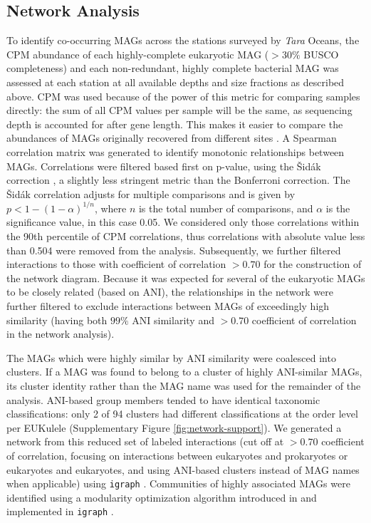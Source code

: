 \documentclass[12pt]{article}
\numberwithin{equation}{section}
\begin{document}
\subsection*{Network Analysis} 

To identify co-occurring MAGs across the stations surveyed by \textit{Tara} Oceans, the CPM abundance of each highly-complete eukaryotic MAG ($>30\%$ BUSCO completeness) and each non-redundant, highly complete bacterial MAG was assessed at each station at all available depths and size fractions as described above. CPM was used because of the power of this metric for comparing samples directly: the sum of all CPM values per sample will be the same, as sequencing depth is accounted for after gene length. This makes it easier to compare the abundances of MAGs originally recovered from different sites \citep{Gradoville_2017}. A Spearman correlation matrix was generated to identify monotonic relationships between MAGs. Correlations were filtered based first on p-value, using the Šidák correction \citep{Sidak_1967}, a slightly less stringent metric than the Bonferroni correction. The Šidák correlation adjusts for multiple comparisons and is given by $p < 1-(1-\alpha)^{1/n}$, where $n$ is the total number of comparisons, and $\alpha$ is the significance value, in this case 0.05. We considered only those correlations within the 90th percentile of CPM correlations, thus correlations with absolute value less than 0.504 were removed from the analysis. Subsequently, we further filtered interactions to those with coefficient of correlation $>0.70$ for the construction of the network diagram. Because it was expected for several of the eukaryotic MAGs to be closely related (based on ANI), the relationships in the network were further filtered to exclude interactions between MAGs of exceedingly high similarity (having both $99\%$ ANI similarity and $>0.70$ coefficient of correlation in the network analysis). 

The MAGs which were highly similar by ANI similarity were coalesced into clusters. If a MAG was found to belong to a cluster of highly ANI-similar MAGs, its cluster identity rather than the MAG name was used for the remainder of the analysis. ANI-based group members tended to have identical taxonomic classifications: only 2 of 94 clusters had different classifications at the order level per EUKulele (Supplementary Figure \ref{fig:network-support}). We generated a network from this reduced set of labeled interactions (cut off at $>0.70$ coefficient of correlation, focusing on interactions between eukaryotes and prokaryotes or eukaryotes and eukaryotes, and using ANI-based clusters instead of MAG names when applicable) using \texttt{igraph} \citep{igraph,teamr}. Communities of highly associated MAGs were identified using a modularity optimization algorithm introduced in \cite{blondel2008fast} and implemented in \texttt{igraph} \citep{igraph}.
\end{document}
